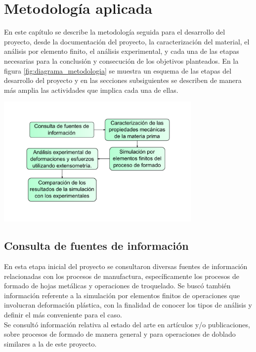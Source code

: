 \chapter{Metodología aplicada}

En este capítulo se describe la metodología seguida para el desarrollo del proyecto, 
desde la documentación del proyecto, la caracterización del material, el análisis por 
elemento finito, el análisis experimental, y cada una de las etapas necesarias para 
la conclusión y consecución de los objetivos planteados. En la figura \ref{fig:diagrama_metodologia} 
se muestra un esquema de las etapas del desarrollo del proyecto y en las secciones 
subsiguientes se describen de manera más amplia las actividades que implica cada una de ellas.

\begin{center}
\includegraphics[width=0.75\textwidth]{src/ch3/diagrama_metodologia.pdf}
\label{fig:diagrama_metodologia}
\end{center}

\section{Consulta de fuentes de información}

En esta etapa inicial del proyecto se consultaron diversas fuentes de información 
relacionadas con los procesos de manufactura, específicamente los procesos 
de formado de hojas metálicas y operaciones de troquelado. Se buscó también información 
referente a la simulación por elementos finitos de operaciones que involucran 
deformación plástica, con la finalidad de conocer los tipos de análisis y definir 
el más conveniente para el caso. \\

Se consultó información relativa al estado del arte en artículos y/o publicaciones, 
sobre procesos de formado de manera general y para operaciones de doblado similares a la 
de este proyecto.

